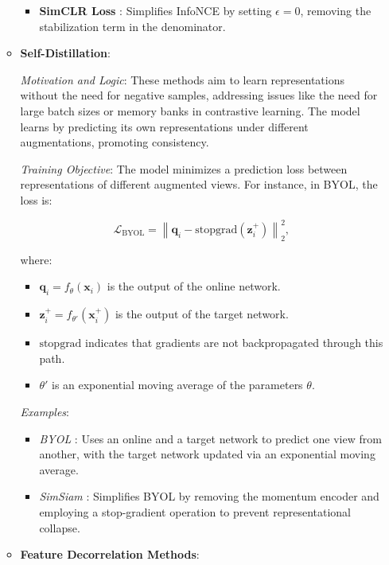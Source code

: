 \begin{itemize}
\begin{itemize}
\begin{itemize}
    \item \textbf{SimCLR Loss} \citep{chen2020simple}: Simplifies InfoNCE by setting \(\epsilon = 0\), removing the stabilization term in the denominator.
\end{itemize}


        \item \textbf{Self-Distillation}:

        \emph{Motivation and Logic}: These methods aim to learn representations without the need for negative samples, addressing issues like the need for large batch sizes or memory banks in contrastive learning. The model learns by predicting its own representations under different augmentations, promoting consistency.

        \emph{Training Objective}: The model minimizes a prediction loss between representations of different augmented views. For instance, in BYOL, the loss is:

        \[
        \mathcal{L}_{\text{BYOL}} = \left\| \mathbf{q}_i - \text{stopgrad}(\mathbf{z}_i^+) \right\|_2^2,
        \]

        where:
        \begin{itemize}
            \item \( \mathbf{q}_i = f_{\theta}(\mathbf{x}_i) \) is the output of the online network.
            \item \( \mathbf{z}_i^+ = f_{\theta'}(\mathbf{x}_i^+) \) is the output of the target network.
            \item \( \text{stopgrad} \) indicates that gradients are not backpropagated through this path.
            \item \( \theta' \) is an exponential moving average of the parameters \( \theta \).
        \end{itemize}

        \emph{Examples}:
        \begin{itemize}
            \item \emph{BYOL} \citep{grill2020bootstrap}: Uses an online and a target network to predict one view from another, with the target network updated via an exponential moving average.
            \item \emph{SimSiam} \citep{chen2021exploring}: Simplifies BYOL by removing the momentum encoder and employing a stop-gradient operation to prevent representational collapse.
        \end{itemize}

        \item \textbf{Feature Decorrelation Methods}:


\end{itemize}
\end{itemize}
